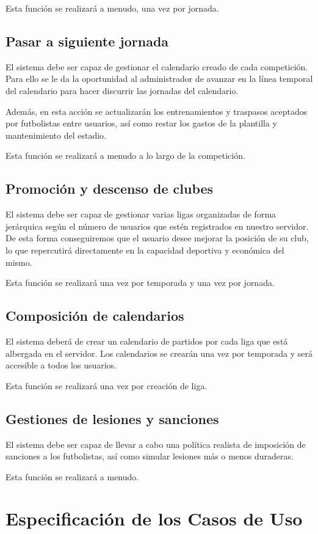 Esta función se realizará a menudo, una vez por jornada.

\subsection*{Pasar a siguiente jornada}
El sistema debe ser capaz de gestionar el calendario creado de cada
competición. Para ello se le da la oportunidad al administrador de avanzar en la
línea temporal del calendario para hacer discurrir las jornadas del calendario.

Además, en esta acción se actualizarán los entrenamientos y traspasos aceptados
por futbolistas entre usuarios, así como restar los gastos de la plantilla y
mantenimiento del estadio.

Esta función se realizará a menudo a lo largo de la competición.

\subsection*{Promoción y descenso de clubes}
El sistema debe ser capaz de gestionar varias ligas organizadas de forma
jerárquica según el número de usuarios que estén registrados en nuestro
servidor. De esta forma conseguiremos que el usuario desee mejorar la posición
de su club, lo que repercutirá directamente en la capacidad deportiva y
económica del mismo.

Esta función se realizará una vez por temporada y una vez por jornada.

\subsection*{Composición de calendarios}
El sistema deberá de crear un calendario de partidos por cada liga que está
albergada en el servidor. Los calendarios se crearán una vez por temporada y
será accesible a todos los usuarios.

Esta función se realizará una vez por creación de liga.
\subsection{Gestiones de lesiones y sanciones}
El sistema debe ser capaz de llevar a cabo una política realista de imposición
de sanciones a los futbolistas, así como simular lesiones más o menos duraderas.

Esta función se realizará a menudo.

\section{Especificación de los Casos de Uso}
